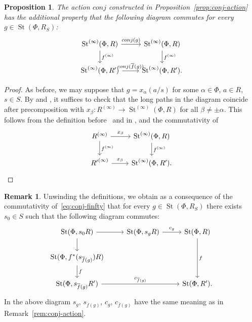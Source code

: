 \documentclass[oneside, 11pt]{amsart} \pdfoutput=1
\newcommand{\St}{\mathop{\mathrm{St}}\nolimits}
\numberwithin{equation}{section}
\newtheorem{prop}[lemma]{Proposition}
\theoremstyle{definition}
\newtheorem{rem}[lemma]{Remark}
\begin{document}
\begin{prop} \label{prop:functoriality}
 The action $conj$ constructed in Proposition~\ref{prop:conj-action} has the additional property that the following diagram commutes for every $g \in \St(\Phi, R_S)$:
 \begin{equation} \label{eq:conj-finfty} \begin{tikzcd} \St^{(\infty)}(\Phi, R) \ar{r}{conj(g)} \ar{d}{f^{(\infty)}} & \St^{(\infty)}(\Phi, R) \ar{d}{f^{(\infty)}} \\ \St^{(\infty)}(\Phi, R') \ar{r}{conj(\overline{f}(g))} & \St^{(\infty)}(\Phi, R'). \end{tikzcd} \end{equation}
\end{prop}
\begin{proof}
As before, we may suppose that \(g = x_\alpha(a/s)\) for some \(\alpha \in \Phi\), \(a \in R\), \(s \in S\). By \cite[Lemma~3.2]{LSV20} and \cite[Lemma~11]{V20}, it suffices to check that the long paths in the diagram coincide after precomposition with \(x_\beta \colon R^{(\infty)} \to \St^{(\infty)}(\Phi, R)\) for all \(\beta \neq \pm \alpha\). This follows from the definition before~\cite[Proposition~4.2]{LSV20} and in \cite[\S 10]{V20}, and the commutativity of
\[\begin{tikzcd}
R^{(\infty)} \ar{r}{x_\beta} \ar{d}{f^{(\infty)}} &
\St^{(\infty)}(\Phi, R) \ar{d}{f^{(\infty)}} \\
{R'}^{(\infty)} \ar{r}{x_\beta} & \St^{(\infty)}(\Phi, R'). \end{tikzcd}\]

\end{proof}

\begin{rem} \label{rem:functoriality}
 Unwinding the definitions, we obtain as a consequence of the commutativity of~\eqref{eq:conj-finfty} that for every $g \in \St(\Phi, R_S)$ there exists $s_0 \in S$ such that the following diagram commutes:
 \[ \begin{tikzcd} \St(\Phi, s_0R) \ar{r} \ar{d} & \St(\Phi, s_g R) \ar{r}{c_{g}} & \St(\Phi, R) \ar{dd}{f} \\
                   \St(\Phi, f^*(s_{\overline{f}(g)})R) \ar{d}{f}   & & \\
                   \St(\Phi, s_{\overline{f}(g)} R')   \ar{rr}{c_{\overline{f}(g)}} & & \St(\Phi, R'). \end{tikzcd} \]
 In the above diagram $s_g$, $s_{\overline{f}(g)}$, $c_g$, $c_{\overline{f}(g)}$ have the same meaning as in Remark~\ref{rem:conj-action}.
\end{rem}
\end{document}
